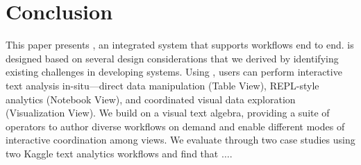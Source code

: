 
\section{Conclusion}\label{sec:conclusion}
This paper presents \system, an integrated system that supports \vita workflows end to end. \system is designed based on several design considerations that we derived by identifying existing challenges in developing \vita systems. Using \system, users can perform interactive text analysis in-situ---direct data manipulation (Table View), REPL-style analytics (Notebook View), and coordinated visual data exploration (Visualization  View).
We build \system on a visual text  algebra,  providing  a suite of operators to author diverse \vita workflows on demand and enable different modes of interactive coordination among views.  We evaluate \system through two case studies using two Kaggle text analytics workflows and find that $\ldots$. 


